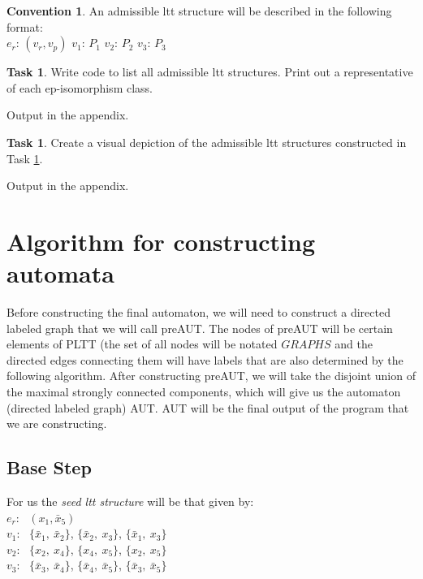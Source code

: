 \documentclass[11pt]{article}
\theoremstyle{definition}
\newtheorem{task}[thm]{Task}
\newtheorem{conv}[thm]{Convention}
\begin{document}
\begin{conv}\label{c:ltt_structures}
An admissible ltt structure will be described in the following format:\\
\indent $e_r$: $(v_r,v_p)$
\indent $v_1$: $P_1$
\indent $v_2$: $P_2$
\indent $v_3$: $P_3$
\end{conv}

\begin{task}\label{t:ltt_structure_list}
Write code to list all admissible ltt structures. Print out a representative of each ep-isomorphism class.
\end{task}

Output in the appendix.

\begin{task}\label{t:ltt_structure_depictions}
Create a visual depiction of the admissible ltt structures constructed in Task \ref{t:ltt_structure_list}.
\end{task}

Output in the appendix.

\medskip


\section{Algorithm for constructing automata}

Before constructing the final automaton, we will need to construct a directed labeled graph that we will call preAUT. The nodes of preAUT will be certain elements of PLTT (the set of all nodes will be notated $GRAPHS$ and the directed edges connecting them will have labels that are also determined by the following algorithm. After constructing preAUT, we will take the disjoint union of the maximal strongly connected components, which will give us the automaton (directed labeled graph) AUT. AUT will be the final output of the program that we are constructing.

\subsection{Base Step}

\indent For us the \emph{seed ltt structure} will be that given by:\\
\indent $e_r$:~ $(x_1,\bar{x}_5)$\\
\indent $v_1$:~ $\{\bar{x}_1,~ \bar{x}_2\}$, $\{\bar{x}_2,~ x_3\}$, $\{\bar{x}_1,~ x_3\}$\\
\indent $v_2$:~  $\{x_2,~ x_4\}$, $\{x_4,~ x_5\}$, $\{x_2,~ x_5\}$\\
\indent $v_3$:~  $\{\bar{x}_3,~ \bar{x}_4\}$, $\{\bar{x}_4,~ \bar{x}_5\}$, $\{\bar{x}_3,~ \bar{x}_5\}$
\end{document}
